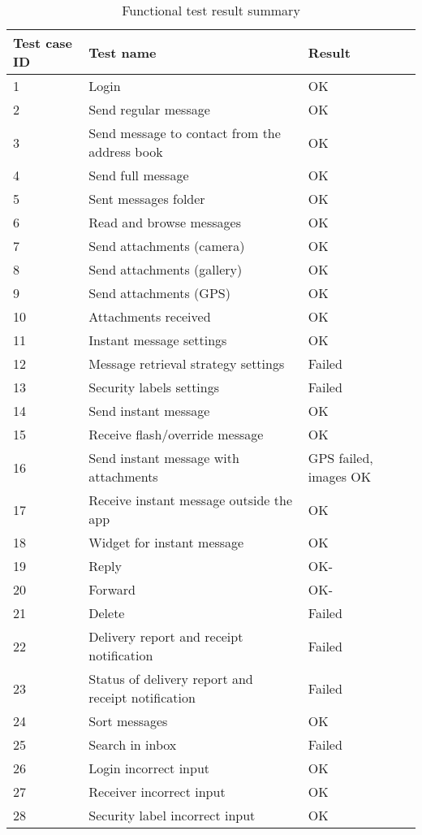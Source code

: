 \begin{table}[hbt]
\begin{center}
					\begin{tabular}{l|l|l}\hline
						\textbf{Test case ID} & \textbf{Test name} & \textbf{Result} \\ \hline \hline
						1&Login&OK\\
						2&Send regular message&OK\\
						3&Send message to contact from the address book&OK\\
						4&Send full message&OK\\
						5&Sent messages folder&OK\\
						6&Read and browse messages&OK\\
						7&Send attachments (camera)&OK\\
						8&Send attachments (gallery)&OK\\
						9&Send attachments (GPS)&OK\\
						10&Attachments received&OK\\
						11&Instant message settings&OK\\
						12&Message retrieval strategy settings&Failed\\
						13&Security labels settings&Failed\\
						14&Send instant message&OK\\
						15&Receive flash/override message&OK\\
						16&Send instant message with attachments&GPS failed, images OK\\
						17&Receive instant message outside the app&OK\\
						18&Widget for instant message&OK\\
						19&Reply&OK-\\
						20&Forward&OK-\\
						21&Delete&Failed\\
						22&Delivery report and receipt notification&Failed\\
						23&Status of delivery report and receipt notification&Failed\\
						24&Sort messages&OK\\
						25&Search in inbox&Failed\\	
						26&Login incorrect input&OK\\
						27&Receiver incorrect input&OK\\
						28&Security label incorrect input&OK\\ \hline
					\end{tabular}
\end{center}
\caption{Functional test result summary} \label{tab:caseresults}
\end{table}


